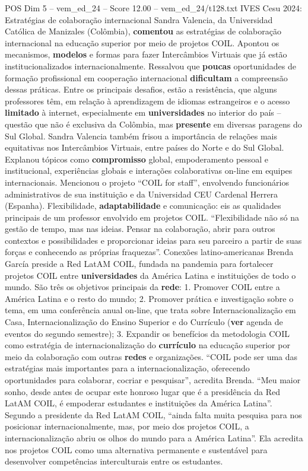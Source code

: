 \begin{textsample}{POS Dim 5 – vem\_ed\_24 – Score 12.00 – vem\_ed\_24/t128.txt}  \label{ex:f5_pos_012}
IVES Cesu 2024: Estratégias de colaboração internacional Sandra Valencia, da Universidad Católica de Manizales (Colômbia), \textbf{comentou} as estratégias de colaboração internacional na educação superior por meio de projetos COIL.
Apontou os mecanismos, \textbf{modelos} e formas para fazer Intercâmbios Virtuais que já estão institucionalizados internacionalmente.
Ressalvou que \textbf{poucas} oportunidades de formação profissional em cooperação internacional \textbf{dificultam} a compreensão dessas práticas.
Entre os principais desafios, estão a resistência, que alguns professores têm, em relação à aprendizagem de idiomas estrangeiros e o acesso \textbf{limitado} à internet, especialmente em \textbf{universidades} no interior do país – questão que não é exclusiva da Colômbia, mas \textbf{presente} em diversas paragens do Sul Global.
Sandra Valencia também frisou a importância de relações mais equitativas nos Intercâmbios Virtuais, entre países do Norte e do Sul Global.
Explanou tópicos como \textbf{compromisso} global, empoderamento pessoal e institucional, experiências globais e interações colaborativas on-line em equipes internacionais.
Mencionou o projeto “COIL for staff”, envolvendo funcionários administrativos de sua instituição e da Universidad CEU Cardenal Herrera (Espanha).
Flexibilidade, \textbf{adaptabilidade} e comunicação: eis as qualidades principais de um professor envolvido em projetos COIL. “Flexibilidade não só na gestão de tempo, mas nas ideias.
Pensar na colaboração, abrir para outros contextos e possibilidades e proporcionar ideias para seu parceiro a partir de suas forças e conhecendo as próprias fraquezas”.
Conexões latino-americanas Brenda García preside a Red LatAM COIL, fundada na pandemia para fortalecer projetos COIL entre \textbf{universidades} da América Latina e instituições de todo o mundo.
São três os objetivos principais da \textbf{rede}: 1.
Promover COIL entre a América Latina e o resto do mundo; 2.
Promover prática e investigação sobre o tema, em uma conferência anual on-line, que trata sobre Internacionalização em Casa, Internacionalização do Ensino Superior e do Currículo (\textbf{ver} agenda de eventos do segundo semestre); 3.
Expandir os benefícios da metodologia COIL como estratégia de internacionalização do \textbf{currículo} na educação superior por meio da colaboração com outras \textbf{redes} e organizações. “COIL pode ser uma das estratégias mais importantes para a internacionalização, oferecendo oportunidades para colaborar, cocriar e pesquisar”, acredita Brenda. “Meu maior sonho, desde antes de ocupar este honroso lugar que é a presidência da Red LatAM COIL, é empoderar estudantes e instituições da América Latina”.
Segundo a presidente da Red LatAM COIL, “ainda falta muita pesquisa para nos posicionar internacionalmente, mas, por meio dos projetos COIL, a internacionalização abriu os olhos do mundo para a América Latina”.
Ela acredita nos projetos COIL como uma alternativa permanente e sustentável para desenvolver competências interculturais entre os estudantes.

\end{textsample}
